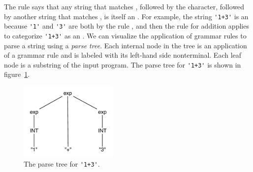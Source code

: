 \documentclass[7x10]{TimesAPriori_MIT}%
\numberwithin{theorem}{chapter}
\numberwithin{definition}{chapter}
\numberwithin{equation}{chapter}
\begin{document}
{The rule  says that any string that matches
, followed by the \code{+} character, followed by another
string that matches , is itself an .  For example,
the string \lstinline{'1+3'} is an  because \lstinline{'1'} and
\lstinline{'3'} are both  by the rule , and then
the rule for addition applies to categorize \lstinline{'1+3'} as an
. We can visualize the application of grammar rules to parse
a string using a \emph{parse tree}. Each
internal node in the tree is an application of a grammar rule and is
labeled with its left-hand side nonterminal. Each leaf node is a
substring of the input program.  The parse tree for \lstinline{'1+3'} is
shown in figure~\ref{fig:simple-parse-tree}.

\begin{figure}[tbp]
\begin{tcolorbox}[colback=white]
\centering
\includegraphics[width=1.9in]{figs/simple-parse-tree}
\end{tcolorbox}
\caption{The parse tree for \lstinline{'1+3'}.}
\label{fig:simple-parse-tree}
\end{figure}

}
\end{document}
